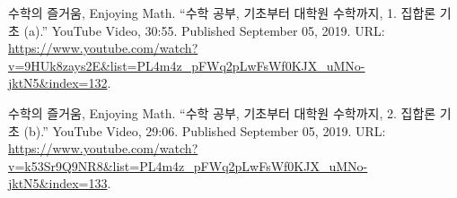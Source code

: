 \documentclass[11pt,openany]{article}
\begin{document}
\vfill
\begin{thebibliography}{9}
	수학의 즐거움, Enjoying Math. ``수학 공부, 기초부터 대학원 수학까지, 1. 집합론 기초 (a).'' YouTube Video, 30:55. Published 
	September 05, 2019. URL: \url{https://www.youtube.com/watch?v=9HUk8zays2E&list=PL4m4z_pFWq2pLwFsWf0KJX_uMNo-jktN5&index=132}.
	
	수학의 즐거움, Enjoying Math. ``수학 공부, 기초부터 대학원 수학까지, 2. 집합론 기초 (b).'' YouTube Video, 29:06. Published 
	September 05, 2019. URL: \url{https://www.youtube.com/watch?v=k53Sr9Q9NR8&list=PL4m4z_pFWq2pLwFsWf0KJX_uMNo-jktN5&index=133}.
\end{thebibliography}
\end{document}
